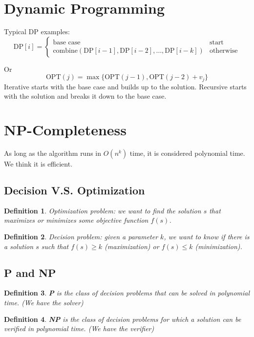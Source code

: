 \documentclass[conference]{IEEEtran}
\newtheorem*{definition}{Definition}
\begin{document}
\section{Dynamic Programming}

Typical DP examples: \[
    \text{DP}[i] = \begin{cases}
        \text{base case} & \text{start} \\
        \text{combine}(\text{DP}[i-1], \text{DP}[i-2], \ldots, \text{DP}[i-k]) & \text{otherwise}
    \end{cases}
\]

Or \[
    \text{OPT}(j) = \max \{ \text{OPT}(j-1), \text{OPT}(j-2) + v_j \}
\]
Iterative starts with the base case and builds up to the solution. Recursive starts with the solution and breaks it down to the base case.

\section{NP-Completeness}
As long as the algorithm runs in $O(n^k)$ time, it is considered polynomial time. We think it is efficient.

\subsection{Decision V.S. Optimization}
\begin{definition}
    Optimization problem: we want to find the solution $s$ that maximizes or minimizes some objective function $f(s)$.
\end{definition}
\begin{definition}
    Decision problem: given a parameter $k$, we want to know if there is a solution $s$ such that $f(s) \geq k$ (maximization) or $f(s) \leq k$ (minimization).
\end{definition}
\subsection{P and NP}
\begin{definition}
    \textbf{P} is the class of decision problems that can be solved in polynomial time. (We have the solver)
\end{definition}
\begin{definition}
    \textbf{NP} is the class of decision problems for which a solution can be verified in polynomial time. (We have the verifier)
\end{definition}
\end{document}
